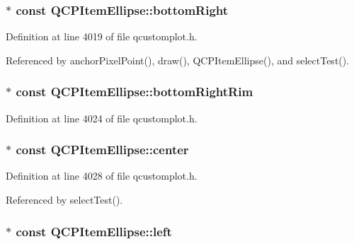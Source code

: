 \subsubsection[{bottom\+Right}]{$\ast$ const Q\+C\+P\+Item\+Ellipse\+::bottom\+Right}\label{class_q_c_p_item_ellipse_ab73c8deafc0d8d1ef7d75b6cdcc37159}


Definition at line 4019 of file qcustomplot.\+h.



Referenced by anchor\+Pixel\+Point(), draw(), Q\+C\+P\+Item\+Ellipse(), and select\+Test().

\hypertarget{class_q_c_p_item_ellipse_a5c8404be601d61b7fafeaaf1c05c4c42}{}
\subsubsection[{bottom\+Right\+Rim}]{$\ast$ const Q\+C\+P\+Item\+Ellipse\+::bottom\+Right\+Rim}\label{class_q_c_p_item_ellipse_a5c8404be601d61b7fafeaaf1c05c4c42}


Definition at line 4024 of file qcustomplot.\+h.

\hypertarget{class_q_c_p_item_ellipse_a8b6dd0e854f99239c5806ffdf2f590b3}{}
\subsubsection[{center}]{$\ast$ const Q\+C\+P\+Item\+Ellipse\+::center}\label{class_q_c_p_item_ellipse_a8b6dd0e854f99239c5806ffdf2f590b3}


Definition at line 4028 of file qcustomplot.\+h.



Referenced by select\+Test().

\hypertarget{class_q_c_p_item_ellipse_aa259cd03efaedf60cf5b1019b20e4f2b}{}
\subsubsection[{left}]{$\ast$ const Q\+C\+P\+Item\+Ellipse\+::left}\label{class_q_c_p_item_ellipse_aa259cd03efaedf60cf5b1019b20e4f2b}


